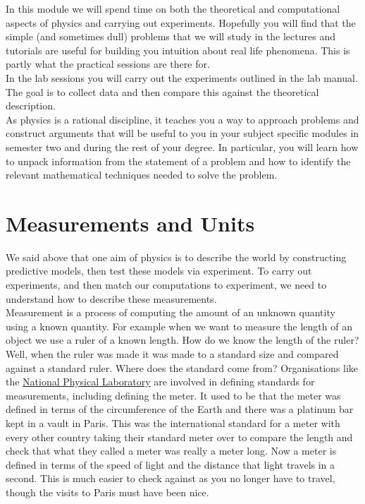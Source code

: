 In this module we will spend time on both the theoretical and computational aspects of physics and carrying out experiments.  Hopefully you will find that the simple (and sometimes dull) problems that we will study in the lectures and tutorials are useful for building you intuition about real life phenomena. This is partly what the practical sessions are there for.\\

In the lab sessions you will carry out the experiments outlined in the lab manual. The goal is to collect data and then compare this against the theoretical description.\\

As physics is a rational discipline, it teaches you a way to approach problems and construct arguments that will be useful to you in your subject specific modules in semester two and during the rest of your degree.  In particular, you will learn how to unpack information from the statement of a problem and how to identify the relevant mathematical techniques needed to solve the problem.

\section{Measurements and Units}
We said above that one aim of physics is to describe the world by constructing predictive models, then test these models via experiment. To carry out experiments, and then match our computations to experiment, we need to understand how to describe these measurements. \\

Measurement is a process of computing the amount of an unknown quantity using a known quantity. For example when we want to measure the length of an object we use a ruler of a known length. How do we know the length of the ruler? Well, when the ruler was made it was made to a standard size and compared against a standard ruler. Where does the standard come from? Organisations like the \href{https://www.npl.co.uk/products-services/instruments/standard}{National Physical Laboratory} are involved in defining standards for measurements, including defining the meter. It used to be that the meter was defined in terms of the circumference of the Earth and there was a platinum bar kept in a vault in Paris. This was the international standard for a meter with every other country taking their standard meter over to compare the length and check that what they called a meter was really a meter long. Now a meter is defined in terms of the speed of light and the distance that light travels in a second. This is much easier to check against as you no longer have to travel, though the visits to Paris must have been nice.\\

